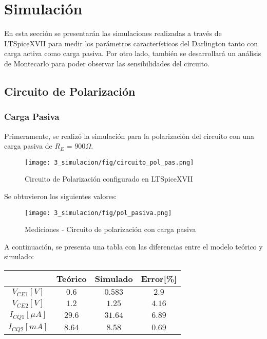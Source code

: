 \chapter{Simulación}
En esta sección se presentarán las simulaciones realizadas a través de LTSpiceXVII para medir los parámetros 
característicos del Darlington tanto con carga activa como carga pasiva. Por otro lado, también se desarrollará 
un análisis de Montecarlo para poder observar las sensibilidades del circuito.


\section{Circuito de Polarización}

\subsection{Carga Pasiva}

Primeramente, se realizó la simulación para la polarización del circuito con una carga pasiva de $R_E$ = $900 \Omega$.
\begin{figure}[H]
    \centering
    \texttt{[image: 3\_simulacion/fig/circuito\_pol\_pas.png]}
    \label{circuito_pol_pas}
    \caption{Circuito de Polarización configurado en LTSpiceXVII}
\end{figure}

Se obtuvieron los siguientes valores:

\begin{figure}[H]
    \centering
    \texttt{[image: 3\_simulacion/fig/pol\_pasiva.png]}
    \label{mediciones_pol_pas}
    \caption{Mediciones - Circuito de polarización con carga pasiva}
\end{figure}

A continuación, se presenta una tabla con las diferencias entre el modelo teórico y simulado:

\begin{table}[H]
    \centering
    \begin{tabular}{|c|c|c|c|}
    \hline
                        & Teórico & Simulado & Error[\%] \\ \hline
    $V_{CE1}[V]$        & $0.6$   & $0.583$  & $2.9$    \\ \hline
    $V_{CE2}[V]$        & $1.2$   & $1.25$   & $4.16$   \\ \hline
    $I_{CQ1}[\mu A]$ & $29.6$  & $31.64$  & $6.89$   \\ \hline  
    $I_{CQ2}[mA]$ & $8.64$  & $8.58$  & $0.69$   \\ \hline
    \end{tabular}
    \end{table}


